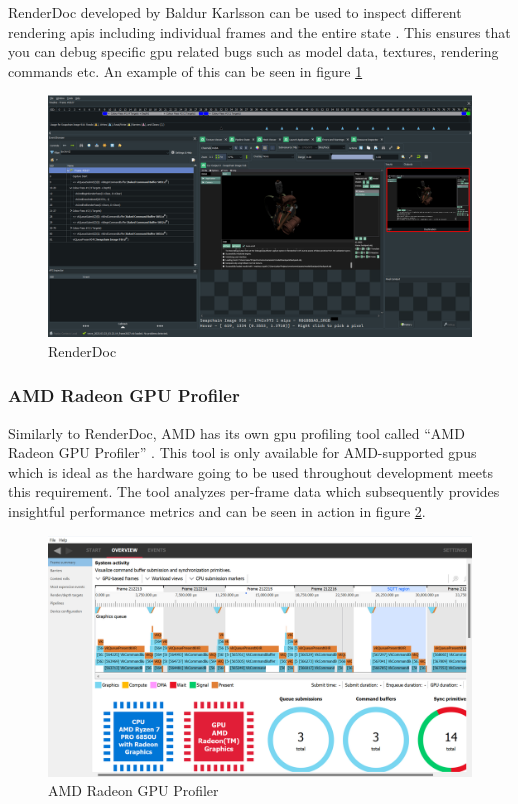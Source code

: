 \documentclass[11pt]{article}
\begin{document}
RenderDoc developed by Baldur Karlsson can be used to inspect different
rendering \glspl{api} including individual frames and the entire state
\cite{renderdoc}. This ensures that you can debug specific \gls{gpu} related
bugs such as model data, textures, rendering commands etc. An example of this
can be seen in figure \ref{fig:renderdoc}
\begin{figure}[h!]
  \centering
  \includegraphics[width=\textwidth]{images/renderdoc.png}
  \caption{RenderDoc}
  \label{fig:renderdoc}
\end{figure}

\subsubsection{AMD Radeon GPU Profiler}
Similarly to RenderDoc, AMD has its own \gls{gpu} profiling tool called ``AMD
Radeon GPU Profiler'' \cite{rgp}. This tool is only available for AMD-supported
\glspl{gpu} which is ideal as the hardware going to be used throughout
development meets this requirement. The tool analyzes per-frame data which
subsequently provides insightful performance metrics and can be seen in action
in figure \ref{fig:amd_profiler}.

\begin{figure}[h!]
  \centering
  \includegraphics[width=\textwidth]{images/amd_profiler.png}
  \caption{AMD Radeon GPU Profiler}
  \label{fig:amd_profiler}
\end{figure}
\end{document}
